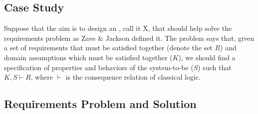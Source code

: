 \documentclass[10pt, final, conference, compsocconf]{IEEEtran}
\begin{document}
\subsection*{Case Study}
Suppose that the aim is to design an , call it X, that should help solve the requirements problem as Zave \& Jackson \cite{Zave+:1997:TOSEM} defined it. The problem says that, given a set of requirements that must be satisfied together (denote the set $R$) and domain assumptions which must be satisfied together ($K$), we should find a specification of properties and behaviors of the system-to-be ($S$) such that $K, S \vdash R$, where $\vdash$ is the consequence relation of classical logic.


\subsection{Requirements Problem and Solution}\label{s:components:requirements-problem-and-solution}
\end{document}

